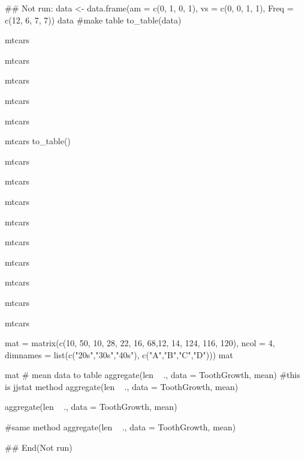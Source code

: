 \documentclass[a4paper]{book}
\begin{document}
\begin{Examples}
\begin{ExampleCode}
## Not run: 
data <- data.frame(am = c(0, 1, 0, 1),
                   vs = c(0, 0, 1, 1),
                   Freq = c(12, 6, 7, 7))
data
#make  table
to_table(data)

mtcars %

mtcars %

mtcars %

mtcars %

mtcars %

mtcars %
to_table()%

mtcars %

mtcars %

mtcars %

mtcars %

mtcars %

mtcars %

mtcars %

mtcars %

mtcars %

mat = matrix(c(10, 50, 10, 28, 22, 16, 68,12, 14, 124, 116, 120),
ncol = 4,
dimnames = list(c("20s","30s","40s"),
                c("A","B","C","D")))
mat

mat  %
# mean data to table
aggregate(len ~ ., data = ToothGrowth, mean) %
#this is jjstat method
aggregate(len ~ ., data = ToothGrowth, mean) %

aggregate(len ~ ., data = ToothGrowth, mean) %

#same method
aggregate(len ~ ., data = ToothGrowth, mean) %


## End(Not run)
\end{ExampleCode}
\end{Examples}
\end{document}
